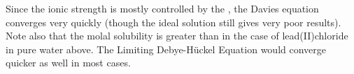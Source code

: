 \documentclass[12pt, openany, letterpaper]{memoir}
\begin{document}
	Since the ionic strength is mostly controlled by the , the Davies equation  converges very quickly (though the ideal solution still gives very poor results). Note also that the molal solubility is greater than in the case of lead(II)chloride in pure water above. The Limiting Debye-H\"uckel Equation would converge quicker as well in most cases.
\end{document}
